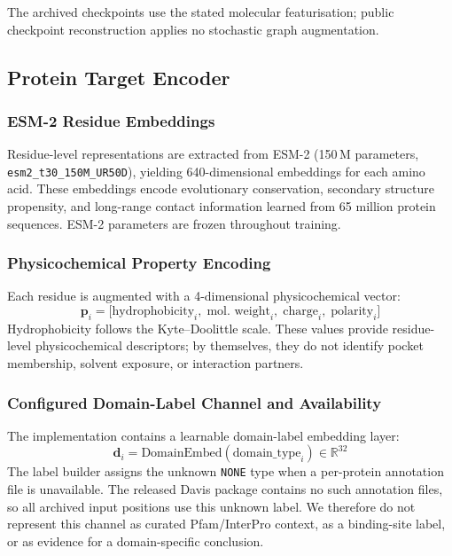 \documentclass[fleqn,10pt]{wlscirep}
\begin{document}
\begingroup\color{red}
The archived checkpoints use the stated molecular featurisation; public
checkpoint reconstruction applies no stochastic graph augmentation.
\endgroup

\subsection{Protein Target Encoder}

\subsubsection{ESM-2 Residue Embeddings}

Residue-level representations are extracted from ESM-2 (150\,M parameters,
\texttt{esm2\_t30\_150M\_UR50D}),\cite{lin2023evolutionary} yielding
640-dimensional embeddings for each amino acid.  These embeddings encode
evolutionary conservation, secondary structure propensity, and long-range contact
information learned from 65 million protein sequences.  ESM-2 parameters are
frozen throughout training.

\subsubsection{Physicochemical Property Encoding}

Each residue is augmented with a 4-dimensional physicochemical vector:
\begin{equation}
\mathbf{p}_i = \bigl[\text{hydrophobicity}_i,\;\text{mol.\ weight}_i,\;
  \text{charge}_i,\;\text{polarity}_i\bigr]
\end{equation}
Hydrophobicity follows the Kyte--Doolittle scale.\cite{kyte1982simple}
These values provide residue-level physicochemical descriptors; by themselves,
they do not identify pocket membership, solvent exposure, or interaction
partners.

\begingroup\color{red}
\subsubsection{Configured Domain-Label Channel and Availability}

The implementation contains a learnable domain-label embedding layer:
\begin{equation}
\mathbf{d}_i = \mathrm{DomainEmbed}(\text{domain\_type}_i) \in \mathbb{R}^{32}
\end{equation}
The label builder assigns the unknown \texttt{NONE} type when a per-protein
annotation file is unavailable. The released Davis package contains no such
annotation files, so all archived input positions use this unknown label. We
therefore do not represent this channel as curated Pfam/InterPro context, as a
binding-site label, or as evidence for a domain-specific conclusion.
\endgroup
\end{document}
